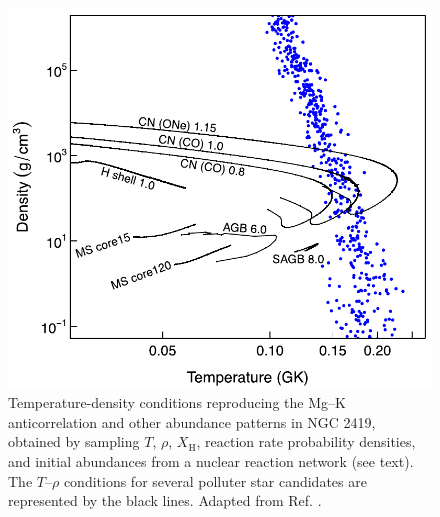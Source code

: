 \begin{figure}[t]
\centering
\includegraphics[width=4.5in]{Chapter-6/figs/Trho_Iliadis2016.png}
\caption{\label{fig:Trho_Iliadis}Temperature-density conditions reproducing the Mg--K anticorrelation and other abundance patterns in NGC 2419, obtained by sampling $T$, $\rho$, $X_{\mathrm{H}}$, reaction rate probability densities, and initial abundances from a nuclear reaction network (see text). The $T$--$\rho$ conditions for several polluter star candidates are represented by the black lines. Adapted from Ref. \cite{Iliadis2016}.}
\end{figure}


